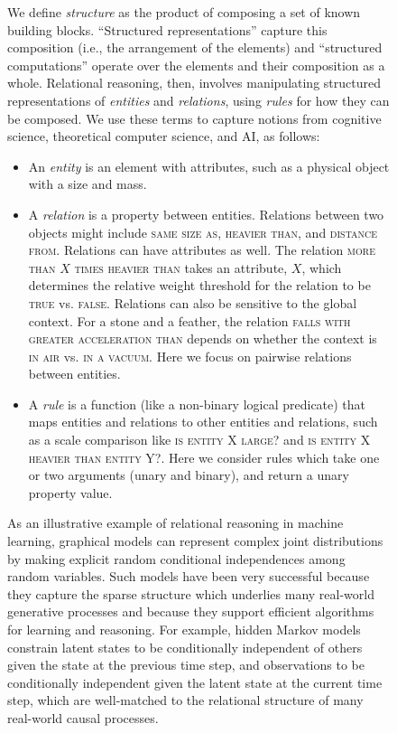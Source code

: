 \begin{figure}[t!]
\begin{infobox}
We define \emph{structure} as the product of composing a set of known building blocks.
``Structured representations'' capture this composition (i.e., the arrangement of the elements) and ``structured computations'' operate over the elements and their composition as a whole.
Relational reasoning, then, involves manipulating structured representations of \emph{entities} and \emph{relations}, using \emph{rules} for how they can be composed.
We use these terms to capture notions from cognitive science, theoretical computer science, and AI, as follows:
\begin{itemize}[noitemsep]
\item An \emph{entity} is an element with attributes, such as a physical object with a size and mass.
\item A \emph{relation} is a property between entities. Relations between two objects might include \textsc{same size as}, \textsc{heavier than}, and \textsc{distance from}.
Relations can have attributes as well. The relation \textsc{more than $X$ times heavier than} takes an attribute, $X$, which determines the relative weight threshold for the relation to be \textsc{true} vs. \textsc{false}. 
Relations can also be sensitive to the global context. For a stone and a feather, the relation \textsc{falls with greater acceleration than} depends on whether the context is \textsc{in air} vs. \textsc{in a vacuum}. Here we focus on pairwise relations between entities.
\item A \emph{rule} is a function (like a non-binary logical predicate) that maps entities and relations to other entities and relations, such as a scale comparison like \textsc{is entity X large?} and \textsc{is entity X heavier than entity Y?}. Here we consider rules which take one or two arguments (unary and binary), and return a unary property value.
\end{itemize}
As an illustrative example of relational reasoning in machine learning, graphical models \citep{pearl1988probabilistic,koller2009probabilistic} can represent complex joint distributions by making explicit random conditional independences among random variables.
Such models have been very successful because they capture the sparse structure which underlies many real-world generative processes and because they support efficient algorithms for learning and reasoning. 
For example, hidden Markov models constrain latent states to be conditionally independent of others given the state at the previous time step, and observations to be conditionally independent given the latent state at the current time step, which are well-matched to the relational structure of many real-world causal processes.

\end{infobox}
\end{figure}
